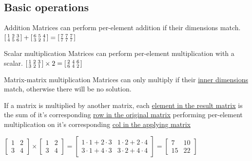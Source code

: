 \documentclass{article}
\begin{document}
\subsection{Basic operations}
\begin{knBox}[]{Addition}
    Matrices can perform per-element addition if their dimensions match.
    \tcblower
    $\begin{bsmallmatrix}
        1 & 2 & 3\\
        4 & 5 & 6
    \end{bsmallmatrix} + \begin{bsmallmatrix}
        6 & 5 & 4\\
        3 & 2 & 1
    \end{bsmallmatrix} = \begin{bsmallmatrix}
        7 & 7 & 7\\7 & 7 & 7
    \end{bsmallmatrix}
    $
\end{knBox}
\begin{knBox}[]{Scalar multiplication}
    Matrices can perform per-element multiplication with a scalar.
    \tcblower
    $\begin{bsmallmatrix}
        1 & 2 & 3\\3 & 2 & 1
    \end{bsmallmatrix} \times 2 = \begin{bsmallmatrix}
        2 & 4 & 6\\6 & 4 & 2
    \end{bsmallmatrix}$
\end{knBox}
\begin{knBox}[]{Matrix-matrix multiplication}
    Matrices can only multiply if their \underline{inner dimensions} match, otherwise there will be no solution.
    
    If a matrix is multiplied by another matrix, each \underline{element in the result matrix} is the sum of it's corresponding \underline{row in the original matrix} performing per-element multiplication on it's corresponding \underline{col in the applying matrix}

    \tcblower
    $\begin{bmatrix}
        1 & 2\\3 & 4
    \end{bmatrix} \times \begin{bmatrix}
        1 & 2\\3 & 4
    \end{bmatrix}=\begin{bmatrix}
        1\cdot 1 + 2 \cdot 3&1\cdot 2 + 2\cdot 4\\3\cdot 1 + 4\cdot 3&3\cdot 2 + 4\cdot 4
    \end{bmatrix} = \begin{bmatrix}
        7 & 10\\15 & 22
    \end{bmatrix}$
\end{knBox}
\end{document}
